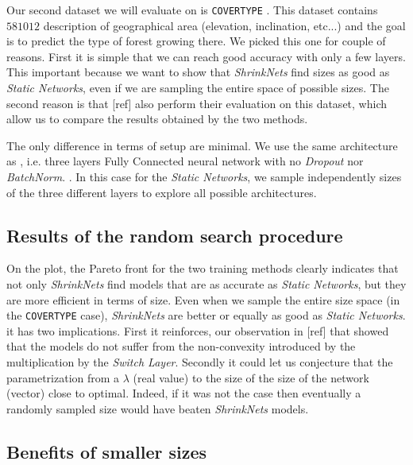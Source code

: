 Our second dataset we will evaluate on is \texttt{COVERTYPE} \cite{Blackard:1998:CNN:928509}. This dataset
contains $581012$ description of geographical area (elevation, inclination,
etc...) and the goal is to predict the type of forest growing there. We picked
this one for couple of reasons. First it is simple that we can reach good
accuracy with only a few layers. This important because we want to show that
\textit{ShrinkNets} find sizes as good as \textit{Static Networks}, even if we
are sampling the entire space of possible sizes. The second reason is that [ref]
also perform their evaluation on this dataset, which allow us to compare the
results obtained by the two methods.

The only difference in terms of setup are minimal. We use the same architecture
as \cite{Scardapane2017}, i.e. three layers Fully Connected neural network with  no
\textit{Dropout} \cite{Srivastava2014} nor \textit{BatchNorm}. . In this case for the \textit{Static Networks}, we sample
independently sizes of the three different layers to explore all possible
architectures.

\subsection{Results of the random search procedure}

On the plot, the Pareto front for the two training methods clearly indicates
that not only \textit{ShrinkNets} find models that are as accurate as
\textit{Static Networks}, but they are more efficient in terms of size. Even
when we sample the entire size space (in the \texttt{COVERTYPE} case),
\textit{ShrinkNets} are better or equally as good as \textit{Static Networks}.
it has two implications. First it reinforces, our observation in [ref] that
showed that the models do not suffer from the non-convexity introduced by the
multiplication by the \textit{Switch Layer}. Secondly it could let us conjecture
that the parametrization from a $\lambda$ (real value) to the size of the
size of the network (vector) close to optimal. Indeed, if it was
not the case then eventually a randomly sampled size would have beaten
\textit{ShrinkNets} models. 

\subsection{Benefits of smaller sizes}

